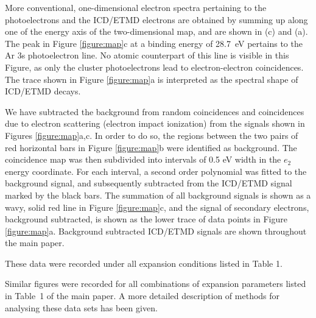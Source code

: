\documentclass[journal=jpccck,manuscript=suppinfo]{achemso}
\begin{document}
More conventional, one-dimensional electron spectra pertaining to the photoelectrons and the ICD/ETMD electrons are obtained by summing up along one of the energy axis of the two-dimensional map, and are shown in (c) and (a). 
The peak in Figure \ref{figure:map}c at a binding energy of 28.7~eV pertains to the Ar 3s photoelectron line.
No atomic counterpart of this line is visible in this Figure, as only the cluster photoelectrons lead to electron-electron coincidences.
The trace shown in Figure \ref{figure:map}a is interpreted as the spectral shape of ICD/ETMD decays.

We have subtracted the background from random coincidences and coincidences due to electron scattering (electron impact ionization) from the signals shown in Figures \ref{figure:map}a,c.
In order to do so, the regions between the two pairs of red horizontal bars in Figure \ref{figure:map}b were identified as background.
The coincidence map was then subdivided into intervals of 0.5 eV width in the $e_2$ energy coordinate.
For each interval, a second order polynomial was fitted to the background signal, and subsequently subtracted from the ICD/ETMD signal marked by the black bars.
The summation of all background signals is shown as a wavy, solid red line in Figure \ref{figure:map}c, and the signal of secondary electrons, background subtracted, is shown as the lower trace of data points in Figure \ref{figure:map}a.
Background subtracted ICD/ETMD signals are shown throughout the main paper.

These data were recorded under all expansion conditions listed in Table 1.

Similar figures were recorded for all combinations of expansion parameters listed in Table~1 of the main paper.
A more detailed description of methods for analysing these data sets has been given.\cite{Foerstel_phd}
%
%
\end{document}
